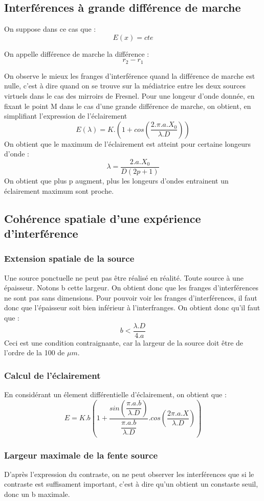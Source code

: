 \subsection{Interférences à grande différence de marche}
On suppose dans ce cas que :
$$E(x) = cte$$
\begin{de}
On appelle différence de marche la différence : 
$$r_2 - r_1$$
\end{de}
On observe le mieux les franges d'interférence quand la différence de marche est nulle, c'est à dire quand on se trouve sur la médiatrice entre les deux sources virtuels dans le cas des mirroirs de Fresnel. Pour une longeur d'onde donnée, en fixant le point M dans le cas d'une grande différence de marche, on obtient, en simplifiant l'expression de l'éclairement 
$$E(\lambda) = K.(1 + cos(\dfrac{2.\pi.a.X_0}{\lambda.D}))$$
On obtient que le maximum de l'éclairement est atteint pour certaine longeurs d'onde : 
$$\lambda = \dfrac{2.a.X_0}{D(2p+1)}$$
On obtient que plus p augment, plus les longeurs d'ondes entrainent un éclairement maximum sont proche.
\subsection{Cohérence spatiale d'une expérience d'interférence}
\subsubsection{Extension spatiale de la source}
Une source ponctuelle ne peut pas être réalisé en réalité. Toute source à une épaisseur. Notons b cette largeur. On obtient donc que les franges d'interférences ne sont pas sans dimensions. Pour pouvoir voir les franges d'interférences, il faut donc que l'épaisseur soit bien inférieur à l'interfranges. On obtient donc qu'il faut que : 
$$b < \dfrac{\lambda.D}{4.a}$$
Ceci est une condition contraignante, car la largeur de la source doit être de l'ordre de la 100 de $\mu m$.
\subsubsection{Calcul de l'éclairement}
En considérant un élement différentielle d'éclairement, on obtient que : 
$$E = K.b(1+\dfrac{sin(\dfrac{\pi.a.b}{\lambda.D})}{\dfrac{\pi.a.b}{\lambda.D}}.cos(\dfrac{2\pi.a.X}{\lambda.D}))$$
\subsubsection{Largeur maximale de la fente source}
D'après l'expression du contraste, on ne peut observer les interférences que si le contraste est suffisament important, c'est à dire qu'un obtient un constaste seuil, donc un b maximale.
